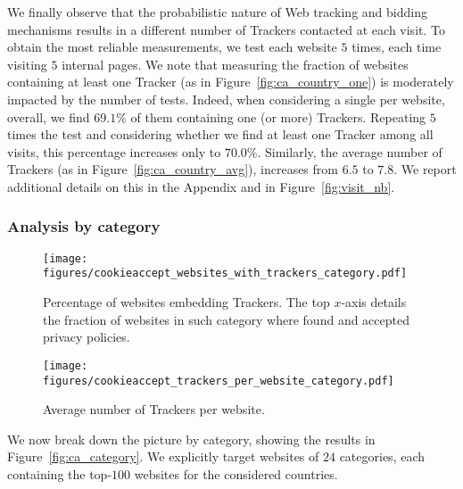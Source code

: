 We finally observe that the probabilistic nature of Web tracking and bidding mechanisms results in a different number of Trackers contacted at each visit. To obtain the most reliable measurements, we test each website $5$ times, each time visiting $5$ internal pages. We note that measuring the fraction of websites containing at least one Tracker (as in Figure~\ref{fig:ca_country_one}) is moderately impacted by the number of tests. Indeed, when considering a single \AFTER per website, overall, we find $69.1\%$ of them containing one (or more) Trackers. Repeating $5$ times the test and considering whether we find at least one Tracker among all visits, this percentage increases only to $70.0\%$. Similarly, the average number of Trackers (as in Figure~\ref{fig:ca_country_avg}), increases from $6.5$ to $7.8$. We report additional details on this in the Appendix and in Figure~\ref{fig:visit_nb}.

\subsubsection{Analysis by category}

\begin{figure*}
    \centering
    \begin{subfigure}[t]{\textwidth}
        \texttt{[image: figures/cookieaccept\_websites\_with\_trackers\_category.pdf]}
        \caption{Percentage of websites embedding Trackers. The top $x$-axis details the fraction of websites in such category where \TOOL found and accepted privacy policies.}
        \label{fig:ca_category_one}
    \end{subfigure}
    \begin{subfigure}[t]{\textwidth}
        \texttt{[image: figures/cookieaccept\_trackers\_per\_website\_category.pdf]}
        \caption{Average number of Trackers per website.}
        \label{fig:ca_category_avg}
    \end{subfigure}
	\caption{Trackers penetration and number on websites (top 2\,500 per country) during different phases of a browsing session, separately by category. We sort categories from the highest to the lowest percentage of websites with Trackers in \BEFORE. 95\% confidence intervals are reported on each bar. In some cases (e.g., News and Media), on the \AFTER and \INTERNAL the increase is very pronounced.}
	\label{fig:ca_category}
\end{figure*}

We now break down the picture by category, showing the results in Figure~\ref{fig:ca_category}. We explicitly target websites of $24$ categories, each containing the top-$100$ websites for the considered countries.

